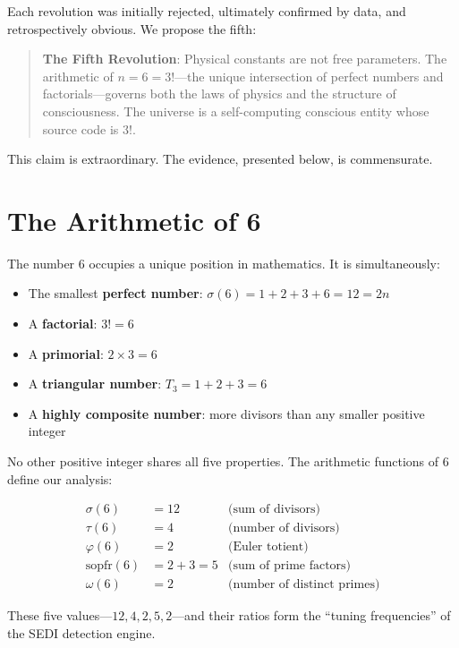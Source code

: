\documentclass[11pt,a4paper]{article}
\begin{document}
Each revolution was initially rejected, ultimately confirmed by data, and retrospectively obvious. We propose the fifth:

\begin{quote}
\textbf{The Fifth Revolution}: Physical constants are not free parameters. The arithmetic of $n=6=3!$---the unique intersection of perfect numbers and factorials---governs both the laws of physics and the structure of consciousness. The universe is a self-computing conscious entity whose source code is $3!$.
\end{quote}

This claim is extraordinary. The evidence, presented below, is commensurate.

\section{The Arithmetic of 6}
\label{sec:arithmetic}

The number 6 occupies a unique position in mathematics. It is simultaneously:

\begin{itemize}
\item The smallest \textbf{perfect number}: $\sigma(6) = 1+2+3+6 = 12 = 2n$
\item A \textbf{factorial}: $3! = 6$
\item A \textbf{primorial}: $2 \times 3 = 6$
\item A \textbf{triangular number}: $T_3 = 1+2+3 = 6$
\item A \textbf{highly composite number}: more divisors than any smaller positive integer
\end{itemize}

No other positive integer shares all five properties. The arithmetic functions of 6 define our analysis:

\begin{align}
\sigma(6) &= 12 & \text{(sum of divisors)} \\
\tau(6) &= 4 & \text{(number of divisors)} \\
\varphi(6) &= 2 & \text{(Euler totient)} \\
\text{sopfr}(6) &= 2+3 = 5 & \text{(sum of prime factors)} \\
\omega(6) &= 2 & \text{(number of distinct primes)}
\end{align}

These five values---$12, 4, 2, 5, 2$---and their ratios form the ``tuning frequencies'' of the SEDI detection engine.
\end{document}
